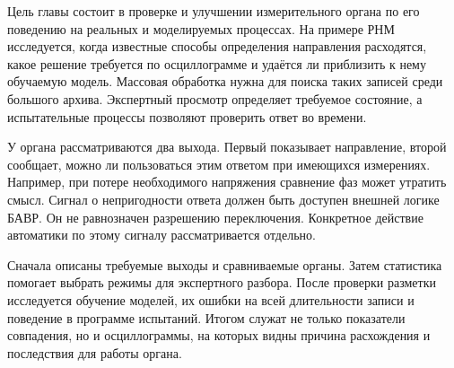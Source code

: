 Цель главы состоит в проверке и улучшении измерительного органа
по его поведению на реальных и моделируемых процессах.
На примере РНМ исследуется, когда известные способы определения
направления расходятся, какое решение требуется по осциллограмме
и удаётся ли приблизить к нему обучаемую модель.
Массовая обработка нужна для поиска таких записей среди большого
архива. Экспертный просмотр определяет требуемое состояние,
а испытательные процессы позволяют проверить ответ во времени.

У органа рассматриваются два выхода. Первый показывает направление,
второй сообщает, можно ли пользоваться этим ответом при имеющихся
измерениях. Например, при потере необходимого напряжения сравнение
фаз может утратить смысл. Сигнал о непригодности ответа должен быть
доступен внешней логике БАВР. Он не равнозначен разрешению переключения.
Конкретное действие автоматики по этому сигналу рассматривается отдельно.

Сначала описаны требуемые выходы и сравниваемые органы.
Затем статистика помогает выбрать режимы для экспертного разбора.
После проверки разметки исследуется обучение моделей, их ошибки
на всей длительности записи и поведение в программе испытаний.
Итогом служат не только показатели совпадения, но и осциллограммы,
на которых видны причина расхождения и последствия для работы органа.

\iffalse
\ifdefined\AuthorReview
\par\smallskip\begingroup\small\raggedright\color{red!60!black}
\noindent\textbf{Примечание рецензента [R5-01], концепция.} Общая методика хорошо связывает массив данных с инженерной проверкой. Для диссертации стоит коротко назвать собственный результат главы: что именно разработано и проверено, а что пока предложено. Сейчас общая последовательность местами звучит как рекомендация исследователю. В выводах различить выполненную экспертную адаптацию РНМ и ещё не завершённый цикл изменения аналитического органа. Не требуется доказывать преимущество сети над всеми органами или заново описывать архитектуры главы 4.\par\endgroup\smallskip
\fi
\ifdefined\AuthorReview
\par{}\smallskip
\fi

